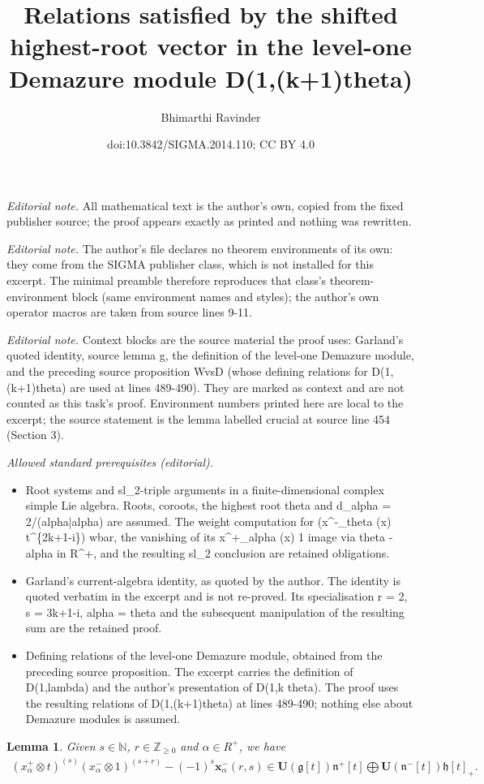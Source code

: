 \documentclass[10pt,a4paper]{amsart}
\title{Relations satisfied by the shifted highest-root vector in the level-one Demazure module D(1,(k+1)theta)}
\author{Bhimarthi Ravinder}
\date{doi:10.3842/SIGMA.2014.110; CC BY 4.0}
\newtheorem{lemma}{Lemma}
\begin{document}
\maketitle
\noindent\textit{Editorial note.} All mathematical text is the author's own, copied from the fixed publisher source; the proof appears exactly as printed and nothing was rewritten.\par\medskip
\noindent\textit{Editorial note.} The author's file declares no theorem environments of its own: they come from the SIGMA publisher class, which is not installed for this excerpt. The minimal preamble therefore reproduces that class's theorem-environment block (same environment names and styles); the author's own operator macros are taken from source lines 9-11.\par\medskip
\noindent\textit{Editorial note.} Context blocks are the source material the proof uses: Garland's quoted identity, source lemma g, the definition of the level-one Demazure module, and the preceding source proposition WvsD (whose defining relations for D(1,(k+1)theta) are used at lines 489-490). They are marked as context and are not counted as this task's proof. Environment numbers printed here are local to the excerpt; the source statement is the lemma labelled crucial at source line 454 (Section 3).\par\medskip
\noindent\textit{Allowed standard prerequisites (editorial).}\begin{itemize}
\item Root systems and sl\_2-triple arguments in a finite-dimensional complex simple Lie algebra. Roots, coroots, the highest root theta and d\_alpha = 2/(alpha|alpha) are assumed. The weight computation for (x\textasciicircum{}-\_theta (x) t\textasciicircum{}\{2k+1-i\}) wbar, the vanishing of its x\textasciicircum{}+\_alpha (x) 1 image via theta - alpha in R\textasciicircum{}+, and the resulting sl\_2 conclusion are retained obligations.
\item Garland's current-algebra identity, as quoted by the author. The identity is quoted verbatim in the excerpt and is not re-proved. Its specialisation r = 2, s = 3k+1-i, alpha = theta and the subsequent manipulation of the resulting sum are the retained proof.
\item Defining relations of the level-one Demazure module, obtained from the preceding source proposition. The excerpt carries the definition of D(1,lambda) and the author's presentation of D(1,k theta). The proof uses the resulting relations of D(1,(k+1)theta) at lines 489-490; nothing else about Demazure modules is assumed.
\end{itemize}\medskip
\begin{lemma}\label{garland}
Given $s\in\mathbb{N}$, $r\in\mathbb{Z}_{\geq0}$ and $\alpha\in R^{+}$, we have
\begin{gather*}
(x^{+}_{\alpha} \otimes t)^{(s)}(x^{-}_{\alpha} \otimes
1)^{(s+r)}-(-1)^s\mathbf{x}^{-}_{\alpha}(r,s)\in\mathbf{U}(\mathfrak{g}[t])\mathfrak{n}^{+}[t]\bigoplus
\mathbf{U}(\mathfrak{n}^{-}[t])\mathfrak{h}[t]_{+}.
\end{gather*}
\end{lemma}
\end{document}
